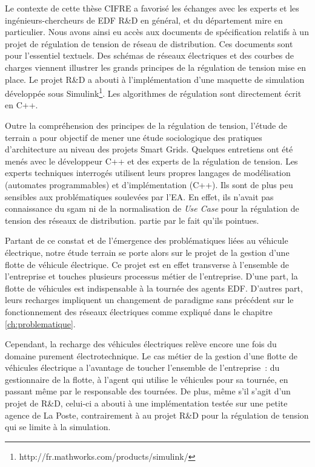 Le contexte de cette thèse CIFRE a favorisé les échanges avec les experts et les
ingénieurs-chercheurs de EDF R\&D en général, et du département \gls{mire} en
particulier. Nous avons ainsi eu accès aux documents de spécification relatifs à
un projet de régulation de tension de réseau de distribution. Ces documents sont
pour l'essentiel textuels. Des schémas de réseaux électriques et des courbes de
charges viennent illustrer les grands principes de la régulation de tension
mise en place. Le projet R\&D a abouti à l'implémentation d'une maquette de
simulation développée sous
Simulink\footnote{http://fr.mathworks.com/products/simulink/}. Les algorithmes
de régulation sont directement écrit en C++.

Outre la compréhension des principes de la régulation de tension, l'étude de
terrain a pour objectif de mener une étude sociologique des pratiques
d'architecture au niveau des projets Smart Grids. Quelques entretiens ont été
menés avec le développeur C++ et des experts de la régulation de tension. Les
experts techniques interrogés utilisent leurs propres langages de modélisation
(automates programmables) et d'implémentation (C++). Ils sont de plus peu
sensibles aux problématiques soulevées par l'EA. En effet, ils n'avait pas
connaissance du \gls{sgam} ni de la normalisation de \textit{Use Case} pour la
régulation de tension des réseaux de distribution. %
partie par le fait qu'ils %
pointues.

Partant de ce constat et de l'émergence des problématiques liées au véhicule
électrique, notre étude terrain se porte alors sur le projet de la gestion
d'une flotte de véhicule électrique. Ce projet est en effet transverse à
l'ensemble de l'entreprise et touches plusieurs processus métier de
l'entreprise. D'une part, la flotte de véhicules est indispensable à la tournée
des agents EDF. D'autres part, leurs recharges impliquent un changement de
paradigme sans précédent sur le fonctionnement des réseaux électriques comme
expliqué dans le chapitre \ref{ch:problematique}.

Cependant, la recharge des véhicules électriques relève encore une fois du
domaine purement électrotechnique. Le cas métier de la gestion d'une flotte de
véhicules électrique a l'avantage de toucher l'ensemble de l'entreprise~: du
gestionnaire de la flotte, à l'agent qui utilise le véhicules pour sa tournée,
en passant même par le responsable des tournées. De plus, même s'il s'agit d'un
projet de R\&D, celui-ci a abouti à une implémentation testée sur une petite
agence de La Poste, contrairement à au projet R\&D pour la régulation de
tension qui se limite à la simulation.


